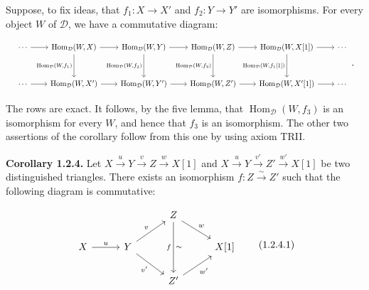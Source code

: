 %
\begingroup
\small
\setlength{\abovedisplayskip}{4pt plus 2pt minus 2pt}%
\setlength{\belowdisplayskip}{4pt plus 2pt minus 2pt}%

Suppose, to fix ideas, that $f_1\colon X\longrightarrow X'$ and
$f_2\colon Y\longrightarrow Y'$ are isomorphisms. For every object $W$ of
$\mathcal D$, we have a commutative diagram:

\begin{equation*}
  \resizebox{0.98\linewidth}{!}{%
    $\begin{tikzcd}[ampersand replacement=\&,column sep=2.15em,row sep=3em]
      \cdots \arrow[r]
        \& \operatorname{Hom}_{\mathcal D}(W,X) \arrow[r] \arrow[d,"{\operatorname{Hom}_{\mathcal D}(W,f_1)}"']
        \& \operatorname{Hom}_{\mathcal D}(W,Y) \arrow[r] \arrow[d,"{\operatorname{Hom}_{\mathcal D}(W,f_2)}"']
        \& \operatorname{Hom}_{\mathcal D}(W,Z) \arrow[r] \arrow[d,"{\operatorname{Hom}_{\mathcal D}(W,f_3)}"']
        \& \operatorname{Hom}_{\mathcal D}(W,X[1]) \arrow[r] \arrow[d,"{\operatorname{Hom}_{\mathcal D}(W,f_1[1])}"']
        \& \cdots \\
      \cdots \arrow[r]
        \& \operatorname{Hom}_{\mathcal D}(W,X') \arrow[r]
        \& \operatorname{Hom}_{\mathcal D}(W,Y') \arrow[r]
        \& \operatorname{Hom}_{\mathcal D}(W,Z') \arrow[r]
        \& \operatorname{Hom}_{\mathcal D}(W,X'[1]) \arrow[r]
        \& \cdots
    \end{tikzcd}$%
  }\,.
\end{equation*}

The rows are exact. It follows, by the five lemma, that
$\operatorname{Hom}_{\mathcal D}(W,f_3)$ is an isomorphism for every $W$,
and hence that $f_3$ is an isomorphism. The other two assertions of the
corollary follow from this one by using axiom TRII.

\medskip
\noindent\textbf{Corollary 1.2.4.}\quad
Let
$X\xrightarrow{u}Y\xrightarrow{v}Z\xrightarrow{w}X[1]$ and
$X\xrightarrow{u}Y\xrightarrow{v'}Z'\xrightarrow{w'}X[1]$
be two distinguished triangles. There exists an isomorphism
$f\colon Z\xrightarrow{\sim}Z'$ such that the following diagram is
commutative:

\begin{equation}
  \begin{tikzcd}[column sep=2.8em,row sep=1.7em]
    && Z \arrow[dr,"w"] \arrow[dd,"f"',"\sim"] & \\
    X \arrow[r,"u"] & Y \arrow[ur,"v"] \arrow[dr,"v'"'] && X[1] \\
    && Z' \arrow[ur,"w'"'] &
  \end{tikzcd}
  \tag{1.2.4.1}
\end{equation}

